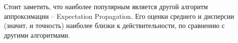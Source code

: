 \documentclass{llncs}
\begin{document}

Стоит заметить, что наиболее популярным является другой алгоритм аппроксимации -- Expectation Propagation. Его оценки среднего и дисперсии (значит, и точность) наиболее близки к действительности, по сравнению с другими алгоритмами.
\end{document}
